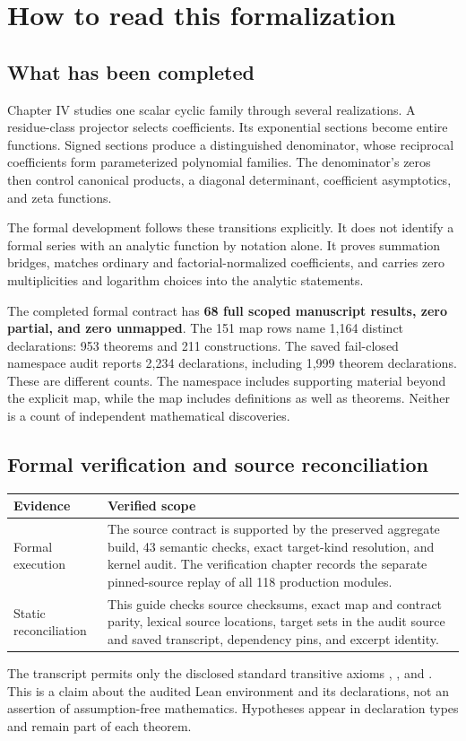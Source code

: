 \section{How to read this formalization}
\subsection{What has been completed}
Chapter IV studies one scalar cyclic family through several realizations. A residue-class projector selects coefficients. Its exponential sections become entire functions. Signed sections produce a distinguished denominator, whose reciprocal coefficients form parameterized polynomial families. The denominator's zeros then control canonical products, a diagonal determinant, coefficient asymptotics, and zeta functions.

The formal development follows these transitions explicitly. It does not identify a formal series with an analytic function by notation alone. It proves summation bridges, matches ordinary and factorial-normalized coefficients, and carries zero multiplicities and logarithm choices into the analytic statements.

The completed formal contract has \textbf{68 full scoped manuscript results, zero partial, and zero unmapped}. The 151 map rows name 1,164 distinct declarations: 953 theorems and 211 constructions. The saved fail-closed namespace audit reports 2,234 declarations, including 1,999 theorem declarations. These are different counts. The namespace includes supporting material beyond the explicit map, while the map includes definitions as well as theorems. Neither is a count of independent mathematical discoveries.

\subsection{Formal verification and source reconciliation}
\begin{longtable}{p{}p{}}
\toprule Evidence & Verified scope \\ \midrule\endhead
Formal execution & The source contract is supported by the preserved aggregate build, 43 semantic checks, exact target-kind resolution, and kernel audit. The verification chapter records the separate pinned-source replay of all 118 production modules. \\
Static reconciliation & This guide checks source checksums, exact map and contract parity, lexical source locations, target sets in the audit source and saved transcript, dependency pins, and excerpt identity. \\

\bottomrule
\end{longtable}
The transcript permits only the disclosed standard transitive axioms , , and . This is a claim about the audited Lean environment and its declarations, not an assertion of assumption-free mathematics. Hypotheses appear in declaration types and remain part of each theorem.

